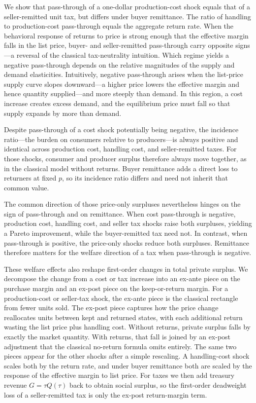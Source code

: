 \documentclass[11pt]{article}
\begin{document}
We show that pass-through of a one-dollar production-cost shock equals that
of a seller-remitted unit tax, but differs under buyer remittance.  The ratio
of handling to production-cost pass-through equals the aggregate return rate.
When the behavioral response of returns to price is strong enough that the
effective margin falls in the list price, buyer- and seller-remitted
pass-through carry opposite signs---a reversal of the classical tax-neutrality
intuition.  Which regime yields a negative pass-through depends on the
relative magnitudes of the supply and demand elasticities.  Intuitively,
negative pass-through arises when the list-price supply curve slopes
downward---a higher price lowers the effective margin and hence quantity
supplied---and more steeply than demand.  In this region, a cost increase
creates excess demand, and the equilibrium price must fall so that supply
expands by more than demand.

Despite pass-through of a cost shock potentially being negative, the
incidence ratio---the burden on consumers relative to producers---is always
positive and identical across production cost, handling cost, and
seller-remitted taxes.  For those shocks, consumer and producer surplus
therefore always move together, as in the classical model without returns.
Buyer remittance adds a direct loss to returners at fixed $p$, so its
incidence ratio differs and need not inherit that common value.

The common direction of those price-only surpluses nevertheless hinges on the
sign of pass-through and on remittance.  When cost pass-through is negative,
production cost, handling cost, and seller tax shocks raise both surpluses,
yielding a Pareto improvement, while the buyer-remitted tax need not.
In contrast, when pass-through is positive, the price-only shocks reduce both
surpluses.  Remittance therefore matters for the welfare direction of a tax
when pass-through is negative.

These welfare effects also reshape first-order changes in total private
surplus.  We decompose the change from a cost or tax increase into an
ex-ante piece on the purchase margin and an ex-post piece on the
keep-or-return margin.  For a production-cost or seller-tax shock, the
ex-ante piece is the classical rectangle from fewer units sold.  The
ex-post piece captures how the
price change reallocates units between kept and returned states, with each
additional return wasting the list price plus handling cost.  Without returns, private surplus falls by exactly the market quantity.
With returns, that fall is joined by an ex-post adjustment that the
classical no-return formula omits entirely.  The same two pieces
appear for the other shocks after a simple rescaling.  A handling-cost shock
scales both by the return rate, and under buyer remittance both are scaled by
the response of the effective margin to list price.  For taxes we then add
treasury revenue $G=\tau Q(\tau)$ back to obtain social surplus, so the
first-order deadweight loss of a seller-remitted tax is only the ex-post
return-margin term.
\end{document}
